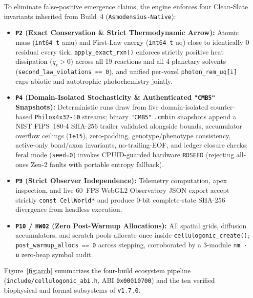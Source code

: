 \documentclass[11pt,reqno]{amsart}
\theoremstyle{plain}
\theoremstyle{definition}
\theoremstyle{remark}
\newcommand{\code}[1]{{\footnotesize\nolinkurl{#1}}}
\begin{document}
To eliminate false-positive emergence claims, the engine enforces four Clean-Slate invariants inherited from Build~4 (\code{Asmodensius-Native}):
\begin{itemize}[leftmargin=1.6em, itemsep=2pt]
  \item \textbf{\texttt{P2} (Exact Conservation \& Strict Thermodynamic Arrow):} Atomic mass (\code{int64_t} amu) and First-Law energy (\code{int64_t} uq) close to identically $0$ residual every tick; \code{apply_exact_rxn()} enforces strictly positive heat dissipation ($q_r > 0$) across all 19 reactions and all 4 planetary solvents (\code{second_law_violations == 0}), and unified per-voxel \code{photon_rem_uq[i]} caps abiotic and autotrophic photochemistry jointly.
  \item \textbf{\texttt{P4} (Domain-Isolated Stochasticity \& Authenticated \texttt{"CMB5"} Snapshots):} Deterministic runs draw from five domain-isolated counter-based \code{Philox4x32-10} streams; binary \code{"CMB5"} \code{.cmbin} snapshots append a NIST FIPS~180-4 SHA-256 trailer validated alongside bounds, accumulator overflow ceilings (\code{1e15}), zero-padding, genotype/phenotype consistency, active-only bond/axon invariants, no-trailing-EOF, and ledger closure checks; feral mode (\code{seed=0}) invokes CPUID-guarded hardware \code{RDSEED} (rejecting all-ones Zen-2 faults with portable entropy fallback).
  \item \textbf{\texttt{P9} (Strict Observer Independence):} Telemetry computation, apex inspection, and live 60~FPS WebGL2 Observatory JSON export accept strictly \texttt{const CellWorld*} and produce 0-bit complete-state SHA-256 divergence from headless execution.
  \item \textbf{\texttt{P10} / \texttt{HW02} (Zero Post-Warmup Allocations):} All spatial grids, diffusion accumulators, and scratch pools allocate once inside \code{cellulogonic_create()}; \code{post_warmup_allocs == 0} across stepping, corroborated by a 3-module \code{nm -u} zero-heap symbol audit.
\end{itemize}

Figure~\ref{fig:arch} summarizes the four-build ecosystem pipeline (\code{include/cellulogonic_abi.h}, ABI \code{0x00010700}) and the ten verified biophysical and formal subsystems of \texttt{v1.7.0}.
\end{document}
